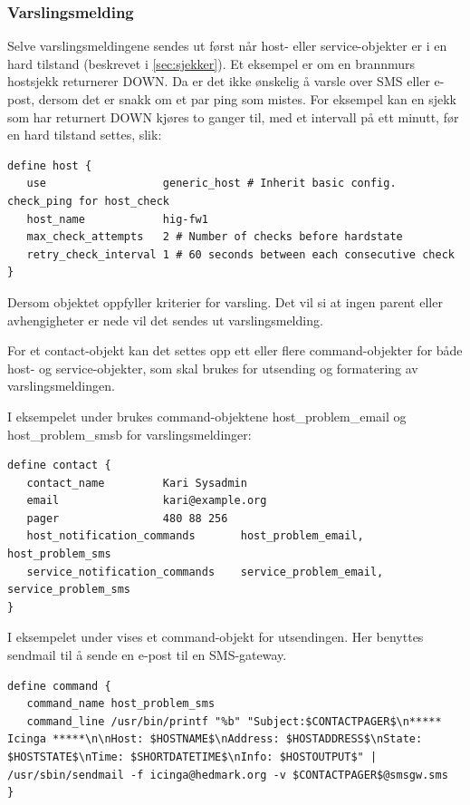 \subsubsection{Varslingsmelding}\label{sec:varslingsmelding}
Selve varslingsmeldingene sendes ut først når host- eller service-objekter er i en hard tilstand (beskrevet i \ref{sec:sjekker}). Et eksempel er om en brannmurs hostsjekk returnerer DOWN. Da er det ikke ønskelig å varsle over SMS eller e-post, dersom det er snakk om et par ping som mistes. For eksempel kan en sjekk som har returnert DOWN kjøres to ganger til, med et intervall på ett minutt, før en hard tilstand settes, slik:

\begin{lstlisting}[style=example]
define host {
   use 					generic_host # Inherit basic config. check_ping for host_check
   host_name			hig-fw1
   max_check_attempts   2 # Number of checks before hardstate
   retry_check_interval	1 # 60 seconds between each consecutive check
}
\end{lstlisting}
Dersom objektet oppfyller kriterier for varsling. Det vil si at ingen parent eller avhengigheter er nede vil det sendes ut varslingsmelding.
 
For et contact-objekt kan det settes opp ett eller flere command-objekter for både host- og service-objekter, som skal brukes for utsending og formatering av varslingsmeldingen.  

I eksempelet under brukes command-objektene host\_problem\_email og host\_problem\_smsb for varslingsmeldinger:
\begin{lstlisting}[style=example]
define contact {
   contact_name 		Kari Sysadmin
   email 				kari@example.org
   pager 				480 88 256 
   host_notification_commands    	host_problem_email, host_problem_sms
   service_notification_commands 	service_problem_email, service_problem_sms
}
\end{lstlisting}

I eksempelet under vises et command-objekt for utsendingen. Her benyttes sendmail \cite{wiki:sendmail} til å sende en e-post til en SMS-gateway.
\begin{lstlisting}[style=example]
define command {
   command_name host_problem_sms
   command_line /usr/bin/printf "%b" "Subject:$CONTACTPAGER$\n***** Icinga *****\n\nHost: $HOSTNAME$\nAddress: $HOSTADDRESS$\nState: $HOSTSTATE$\nTime: $SHORTDATETIME$\nInfo: $HOSTOUTPUT$" | /usr/sbin/sendmail -f icinga@hedmark.org -v $CONTACTPAGER$@smsgw.sms
}
\end{lstlisting}

